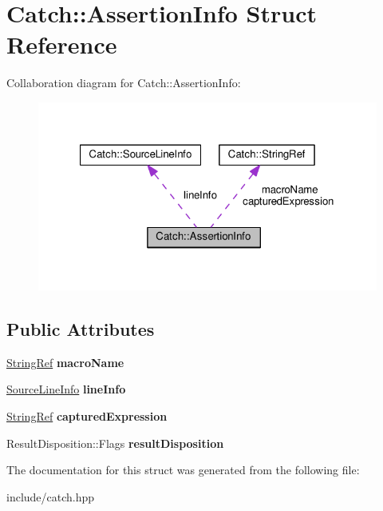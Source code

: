 \hypertarget{structCatch_1_1AssertionInfo}{}\section{Catch\+:\+:Assertion\+Info Struct Reference}
\label{structCatch_1_1AssertionInfo}


Collaboration diagram for Catch\+:\+:Assertion\+Info\+:\nopagebreak
\begin{figure}[H]
\begin{center}
\leavevmode
\includegraphics[width=321pt]{structCatch_1_1AssertionInfo__coll__graph}
\end{center}
\end{figure}
\subsection*{Public Attributes}
\begin{DoxyCompactItemize}
\item 
\hyperlink{classCatch_1_1StringRef}{String\+Ref} {\bfseries macro\+Name}\hypertarget{structCatch_1_1AssertionInfo_aaf3fbb9f1fe09c879ba3d877584e3056}{}\label{structCatch_1_1AssertionInfo_aaf3fbb9f1fe09c879ba3d877584e3056}

\item 
\hyperlink{structCatch_1_1SourceLineInfo}{Source\+Line\+Info} {\bfseries line\+Info}\hypertarget{structCatch_1_1AssertionInfo_a17bdbb404ba12658034f833be2f4c3e7}{}\label{structCatch_1_1AssertionInfo_a17bdbb404ba12658034f833be2f4c3e7}

\item 
\hyperlink{classCatch_1_1StringRef}{String\+Ref} {\bfseries captured\+Expression}\hypertarget{structCatch_1_1AssertionInfo_accd36744b4acaa3a691a72df0b42190f}{}\label{structCatch_1_1AssertionInfo_accd36744b4acaa3a691a72df0b42190f}

\item 
Result\+Disposition\+::\+Flags {\bfseries result\+Disposition}\hypertarget{structCatch_1_1AssertionInfo_a60353b3632ab2f827162f2b2d6911073}{}\label{structCatch_1_1AssertionInfo_a60353b3632ab2f827162f2b2d6911073}

\end{DoxyCompactItemize}


The documentation for this struct was generated from the following file\+:\begin{DoxyCompactItemize}
\item 
include/catch.\+hpp\end{DoxyCompactItemize}
